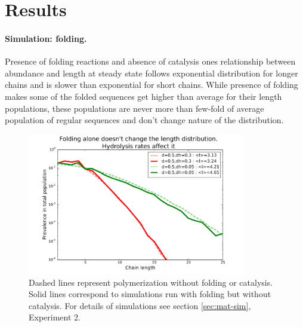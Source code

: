 \documentclass[12pt]{paper}
\begin{document}
% 
% 




\section{Results}\label{sec:res}
\paragraph{Simulation: folding.} Presence of folding reactions and absence of catalysis ones 
relationship between abundance and length at steady state follows exponential distribution for 
longer chains and is slower than exponential for short chains. While presence of folding makes 
some of the folded sequences get higher than average for their length populations, these 
populations are never more than few-fold of average population of regular sequences and don't 
change nature of the distribution.
\begin{figure}[h!]
  \centering
  \includegraphics[width=0.85\textwidth]{pictures/flory-and-fold.pdf} 
  \caption{Dashed lines represent polymerization without folding or catalysis. Solid lines 
correspond to simulations run with folding but without catalysis. For details of simulations see 
section \ref{sec:mat-sim}, Experiment 2. }
  \label{fig:sim.flory-fold}
\end{figure}
\end{document}
